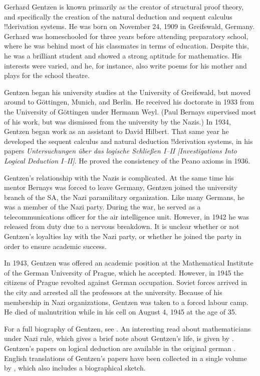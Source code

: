 \documentclass[../../../include/open-logic-section]{subfiles}
\begin{document}



Gerhard Gentzen is known primarily as the creator of structural proof
theory, and specifically the creation of the natural deduction and
sequent calculus !!{derivation} systems. He was born on November 24, 1909 in
Greifswald, Germany. Gerhard was homeschooled for three years before
attending preparatory school, where he was behind most of his
classmates in terms of education. Despite this, he was a brilliant
student and showed a strong aptitude for mathematics. His interests
were varied, and he, for instance, also write poems for his mother and plays
for the school theatre.

Gentzen began his university studies at the University of Greifswald,
but moved around to G\"{o}ttingen, Munich, and Berlin. He received his
doctorate in 1933 from the University of G\"{o}ttingen under Hermann
Weyl.  (Paul Bernays supervised most of his work, but was dismissed
from the university by the Nazis.)  In 1934, Gentzen began work as an
assistant to David Hilbert. That same year he developed the sequent
calculus and natural deduction !!{derivation} systems, in his papers
\emph{Untersuchungen \"{u}ber das logische Schlie\ss en I--II
  [Investigations Into Logical Deduction I--II]}. He proved the
consistency of the Peano axioms in 1936.

Gentzen's relationship with the Nazis is complicated.  At the same
time his mentor Bernays was forced to leave Germany, Gentzen joined
the university branch of the SA, the Nazi paramilitary
organization. Like many Germans, he was a member of the Nazi
party. During the war, he served as a telecommunications officer for
the air intelligence unit. However, in 1942 he was released from duty
due to a nervous breakdown. It is unclear whether or not Gentzen's
loyalties lay with the Nazi party, or whether he joined the party in
order to ensure academic success.

In 1943, Gentzen was offered an academic position at the Mathematical
Institute of the German University of Prague, which he
accepted. However, in 1945 the citizens of Prague revolted against
German occupation. Soviet forces arrived in the city and arrested all
the professors at the university.  Because of his membership in Nazi
organizations, Gentzen was taken to a forced labour camp. He died of
malnutrition while in his cell on August 4, 1945 at the age of 35.

\begin{reading}
For a full biography of Gentzen, see \citet{Menzler-Trott2007}.  An
interesting read about mathematicians under Nazi rule, which gives a
brief note about Gentzen's life, is given by \citet{Segal2014}.
Gentzen's papers on logical deduction are available in the original
german \citep{Gentzen1935a,Gentzen1935b}.  English translations of
Gentzen's papers have been collected in a single volume by
\citet{Gentzen1969}, which also includes a biographical sketch.
\end{reading}
\end{document}

